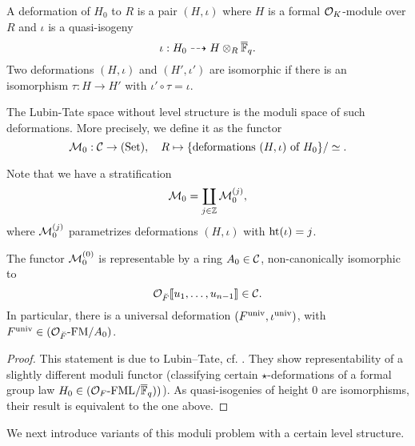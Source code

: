 \documentclass[../main.tex]{subfiles}
\begin{document}
\begin{defi}[Deformation]
  A deformation of $H_0$ to $R$ is a pair $(H, \iota)$ where
  $H$ is a formal $\mathcal{O}_K$-module over $R$ and $\iota$ is a quasi-isogeny
  \begin{equation*}
    \iota: H_0 \dashrightarrow H \otimes_R {\overline {\mathbb{F}}_q}.
  \end{equation*}
  Two deformations $(H, \iota)$ and $(H', \iota')$ are isomorphic if there is
  an isomorphism $\tau: H \to H'$ with $\iota' \circ \tau = \iota$. 
\end{defi}
The Lubin-Tate space without level structure is the moduli space of such deformations.
More precisely, we define it as the functor
\begin{equation*}
  \mathcal{M}_0: \mathcal{C} \to {(\mathrm{Set})}, \quad R \mapsto \{\text{deformations } (H, \iota) \text{
  of $H_0$}\}/\simeq.
\end{equation*}

Note that we have a stratification
\begin{equation*}
  \mathcal{M}_0 = \coprod_{j \in \mathbb{Z}} \mathcal{M}_0^{(j)},
\end{equation*}
where $\mathcal{M}_0^{(j)}$ parametrizes deformations $(H, \iota)$ with $\textnormal{ht}(\iota) = j$.

\begin{thm}[Representability of $\cM_0$]
  The functor $\mathcal{M}_0^{(0)}$ is representable by a ring $A_0 \in \mathcal{C}$, non-canonically 
  isomorphic to
  \begin{equation*}
    \mathcal{O}_{\breve {F}}\llbracket u_1, \dots, u_{n-1} \rrbracket \in \mathcal{C}.
  \end{equation*}
In particular, there is a universal deformation
$(F^{\mathrm{univ}}, \iota^{\mathrm{univ}})$, with $F^{\mathrm{univ}} \in {({\mathcal{O}_{\breve {F}}}\text-\allowbreak\mathrm{FM}/{A_0})}$.
\begin{proof}
  This statement is due to Lubin--Tate, cf. \cite{LubinTate1966FormalModuli}. 
  They show representability of a slightly different moduli functor 
  (classifying certain $\star$-deformations of a formal group law $H_0 \in
  {({\mathcal{O}_F}\text-\allowbreak\mathrm{FML}/{\overline{\mathbb{F}}_q})})$). As quasi-isogenies of height $0$ are isomorphisms,
  their result is equivalent to the one above.
\end{proof}
\end{thm}

We next introduce variants of this moduli problem with a certain level structure.
\end{document}
